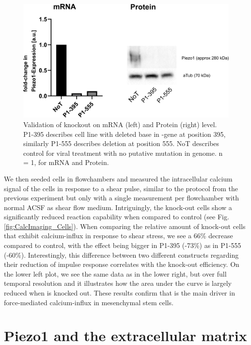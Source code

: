 \begin{figure}
	\centering
	\includegraphics[width=\linewidth]{Piezo1KO_Verification_WBandPCR.png}
	\caption{Validation of knockout on mRNA (left) and Protein (right) level. P1-395 describes cell line with deleted base in \PiezoGene{}-gene at position 395, similarly P1-555 describes deletion at position 555. NoT describes control for viral treatment with no putative mutation in genome. n = 1, for mRNA and Protein.}
	\label{fig:KO-Verification}
\end{figure}

We then seeded cells in flowchambers and measured the intracellular calcium signal of the cells in response to a shear pulse, similar to the protocol from the previous experiment but only with a single measurement per flowchamber with normal ACSF as shear flow medium. Intriguingly, the knock-out cells show a significantly reduced reaction capability when compared to control (see Fig. \ref{fig:CalcImaging_Cells}). When comparing the relative amount of knock-out cells that exhibit calcium-influx in response to shear stress, we see a 66\% decrease compared to control, with the effect being bigger in P1-395 (-73\%) as in P1-555 (-60\%). Interestingly, this difference between two different constructs regarding their reduction of impulse response correlates with the knock-out efficiency. On the lower left plot, we see the same data as in the lower right, but over full temporal resolution and it illustrates how the area under the curve is largely reduced when \Piezo{} is knocked out. 
These results confirm that \Piezo{} is the main driver in force-mediated calcium-influx in mesenchymal stem cells.

\section{Piezo1 and the extracellular matrix}
\label{sec:PiezoandECM}



